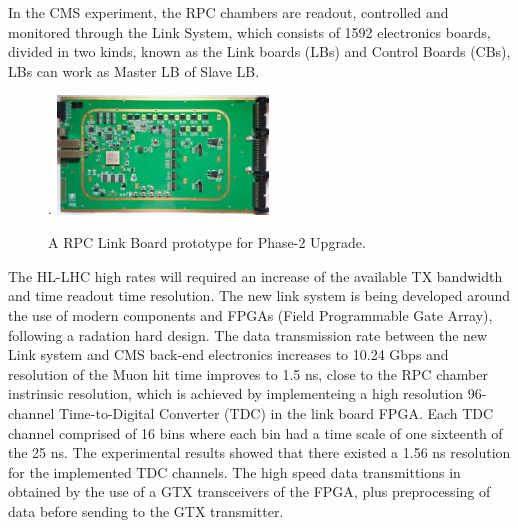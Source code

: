 




In the CMS experiment, the RPC chambers are readout, controlled and monitored through the Link System, which consists of 1592 electronics boards, divided in two kinds, known as the Link boards (LBs) and Control Boards (CBs), LBs can work as Master LB of Slave LB.  


\begin{figure}
    \caption{A RPC Link Board prototype for Phase-2 Upgrade.}
    \label{link_system}.
    \includegraphics[width=0.5\textwidth]{uioposter-images/link_system_board.png}
\end{figure}

The HL-LHC high rates will required an increase of the available TX bandwidth and time readout time resolution. The new link system is being developed around the use of modern components and FPGAs (Field Programmable Gate Array), following a radation hard design. The data transmission rate between the new Link system and CMS back-end electronics increases to 10.24 Gbps and resolution of the Muon hit time improves to 1.5 ns, close to the RPC chamber instrinsic resolution, which is achieved by implementeing a high resolution 96-channel Time-to-Digital Converter (TDC) in the link board FPGA. Each TDC channel comprised of 16 bins where each bin had a time scale of one sixteenth of the 25 ns. The experimental results showed that there existed a 1.56 ns resolution for the implemented TDC channels. The high speed data transmittions in obtained by the use of a GTX transceivers of the FPGA, plus preprocessing of data before sending to the GTX transmitter.






